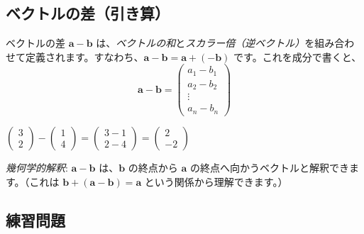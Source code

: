 \subsection{ベクトルの差（引き算）}

ベクトルの差 $\bm{a} - \bm{b}$ は、\emph{ベクトルの和}と\emph{スカラー倍（逆ベクトル）}を組み合わせて定義されます。すなわち、$\bm{a} - \bm{b} = \bm{a} + (-\bm{b})$ です。これを成分で書くと、
\[\bm{a} - \bm{b} = \begin{pmatrix} a_1 - b_1 \\ a_2 - b_2 \\ \vdots \\ a_n - b_n \end{pmatrix}\]

\begin{ex}
$\begin{pmatrix} 3 \\ 2 \end{pmatrix} - \begin{pmatrix} 1 \\ 4 \end{pmatrix} = \begin{pmatrix} 3 - 1 \\ 2 - 4 \end{pmatrix} = \begin{pmatrix} 2 \\ -2 \end{pmatrix}$
\end{ex}

\emph{幾何学的解釈}: $\bm{a} - \bm{b}$ は、$\bm{b}$ の終点から $\bm{a}$ の終点へ向かうベクトルと解釈できます。（これは $\bm{b} + (\bm{a} - \bm{b}) = \bm{a}$ という関係から理解できます。）

\subsection{練習問題}

